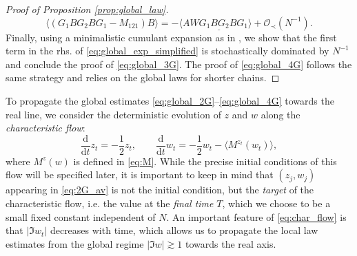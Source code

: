 \documentclass[10pt]{amsart}
\numberwithin{equation}{section}
\newcommand{\dif}{\mathrm{d}}
\begin{document}
\begin{proof}[Proof of Proposition \ref{prop:global_law}]
\begin{equation}
\langle (G_1BG_2BG_1-M_{121})B\rangle = - \langle A\underline{WG_1BG_2BG_1}\rangle + \mathcal{O}_\prec (N^{-1}).
\label{eq:global_exp_simplified}
\end{equation}
Finally, using a minimalistic cumulant expansion as in \cite[Eq.(B.4)-(B.8)]{Multi_res_llaws}, we show that the first term in the rhs. of  \eqref{eq:global_exp_simplified} is stochastically dominated by $N^{-1}$ and conclude the proof of \eqref{eq:global_3G}. The proof of \eqref{eq:global_4G} follows the same strategy and relies on the global laws for shorter chains. 
\end{proof} 


To propagate the global estimates \eqref{eq:global_2G}--\eqref{eq:global_4G} towards the real line, we consider the deterministic evolution of $z$ and $w$ along the \emph{characteristic flow}:
\begin{equation}
\frac{\dif}{\dif t} z_{t}=-\frac{1}{2} z_{t},\qquad\frac{\dif}{\dif t} w_{t} = -\frac{1}{2}w_{t} - \langle M^{z_t}(w_t)\rangle,
\label{eq:char_flow}
\end{equation} 
where $M^z(w)$ is defined in \eqref{eq:M}. While the precise initial conditions of this flow will be specified later, it is important to keep in mind that $(z_j,w_j)$  appearing in \eqref{eq:2G_av} is not the initial condition, but the \emph{target} of the characteristic flow, i.e. the value at the \emph{final time} $T$, which we choose to be a small fixed constant independent of $N$. An important feature of \eqref{eq:char_flow} is that $|\Im w_t|$ decreases with time, which allows us to propagate the local law estimates from the global regime $|\Im w|\gtrsim 1$ towards the real axis. 
\end{document}
